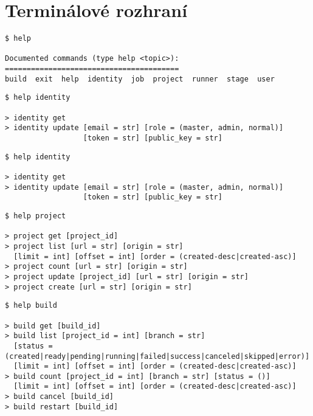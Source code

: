 \clearpage\section{Terminálové rozhraní}
{


\begin{listing}[H]
\begin{verbatim}
$ help

Documented commands (type help <topic>):
========================================
build  exit  help  identity  job  project  runner  stage  user
\end{verbatim}
\end{listing}

\begin{listing}[H]
\begin{verbatim}
$ help identity

> identity get
> identity update [email = str] [role = (master, admin, normal)] 
                  [token = str] [public_key = str]
\end{verbatim}
\end{listing}

\begin{listing}[H]
\begin{verbatim}
$ help identity

> identity get
> identity update [email = str] [role = (master, admin, normal)] 
                  [token = str] [public_key = str]
\end{verbatim}
\end{listing}

\begin{listing}[H]
\begin{verbatim}
$ help project

> project get [project_id]
> project list [url = str] [origin = str]
  [limit = int] [offset = int] [order = (created-desc|created-asc)]
> project count [url = str] [origin = str]
> project update [project_id] [url = str] [origin = str]
> project create [url = str] [origin = str]
\end{verbatim}
\end{listing}

\begin{listing}[H]
\begin{verbatim}
$ help build

> build get [build_id]
> build list [project_id = int] [branch = str]
  [status = (created|ready|pending|running|failed|success|canceled|skipped|error)]
  [limit = int] [offset = int] [order = (created-desc|created-asc)]
> build count [project_id = int] [branch = str] [status = ()]
  [limit = int] [offset = int] [order = (created-desc|created-asc)]
> build cancel [build_id]
> build restart [build_id]
\end{verbatim}
\end{listing}

}
